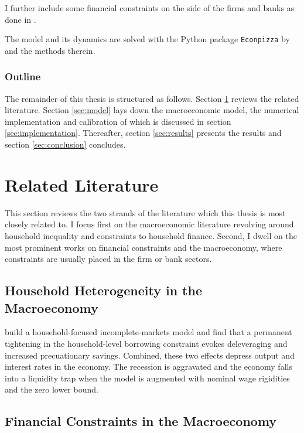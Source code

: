 \documentclass[12pt]{article}
\numberwithin{equation}{section} %
\begin{document}
I further include some financial constraints on the side of the firms and banks as done in \textcite{zoch2022}.

The model and its dynamics are solved with the Python package \texttt{Econpizza} by \textcite{boehl2023econpizza} and the methods therein.

\subsubsection*{Outline}
\label{sec:outline}
The remainder of this thesis is structured as follows. Section \ref{sec:literature} reviews the related literature. Section \ref{sec:model} lays down the macroeconomic model, the numerical implementation and calibration of which is discussed in section \ref{sec:implementation}. Thereafter, section \ref{sec:results} presents the results and section \ref{sec:conclusion} concludes.

\section{Related Literature}
\label{sec:literature}

This section reviews the two strands of the literature which this thesis is most closely related to. I focus first on the macroeconomic literature revolving around household inequality and constraints to household finance. Second, I dwell on the most prominent works on financial constraints and the macroeconomy, where constraints are usually placed in the firm or bank sectors.

\subsection{Household Heterogeneity in the Macroeconomy}
\label{sec:literature-hetero}

\textcite{gl2017} build a household-focused incomplete-markets model and find that a permanent tightening in the household-level borrowing constraint evokes deleveraging and increased precuationary savings. Combined, these two effects depress output and interest rates in the economy. The recession is aggravated and the economy falls into a liquidity trap when the model is augmented with nominal wage rigidities and the zero lower bound. 

\subsection{Financial Constraints in the Macroeconomy}
\label{sec:literature-finance}
\end{document}

